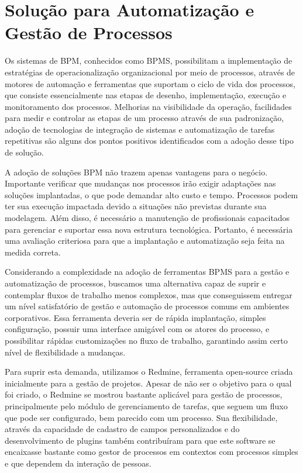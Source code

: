 \section{Solução para Automatização e Gestão de Processos}\label{sec:introducao-ferramenta}

Os sistemas de BPM, conhecidos como BPMS, possibilitam a implementação de estratégias de operacionalização organizacional por meio de processos, através de motores de automação e ferramentas que suportam o ciclo de vida dos processos, que consiste essencialmente nas etapas de desenho, implementação, execução e monitoramento dos processos. Melhorias na visibilidade da operação, facilidades para medir e controlar as etapas de um processo através de sua padronização, adoção de tecnologias de integração de sistemas e automatização de tarefas repetitivas são alguns dos pontos positivos identificados com a adoção desse tipo de solução.  

A adoção de soluções BPM não trazem apenas vantagens para o negócio. Importante verificar que mudanças nos processos irão exigir adaptações nas soluções implantadas, o que pode demandar alto custo e tempo. Processos podem ter sua execução impactada devido a situações não previstas durante sua modelagem. Além disso, é necessário a manutenção de profissionais capacitados para gerenciar e suportar essa nova estrutura tecnológica. Portanto, é necessária uma avaliação criteriosa para que a implantação e automatização seja feita na medida correta.

Considerando a complexidade na adoção de ferramentas BPMS para a gestão e automatização de processos, buscamos uma alternativa capaz de suprir e contemplar fluxos de trabalho menos complexos, mas que conseguissem entregar um nível satisfatório de gestão e automação de processos comuns em ambientes corporativos. Essa ferramenta deveria ser de rápida implantação, simples configuração, possuir uma interface amigável com os atores do processo, e possibilitar rápidas customizações no fluxo de trabalho, garantindo assim certo nível de flexibilidade a mudanças.

Para suprir esta demanda, utilizamos o Redmine, ferramenta open-source criada inicialmente para a gestão de projetos. Apesar de não ser o objetivo para o qual foi criado, o Redmine se mostrou bastante aplicável para gestão de processos, principalmente pelo módulo de gerenciamento de tarefas, que seguem um fluxo que pode ser configurado, bem parecido com um processo. Sua flexibilidade, através da capacidade de cadastro de campos personalizados e do desenvolvimento de plugins também contribuíram para que este software se encaixasse bastante como gestor de processos em contextos com processos simples e que dependem da interação de pessoas.


